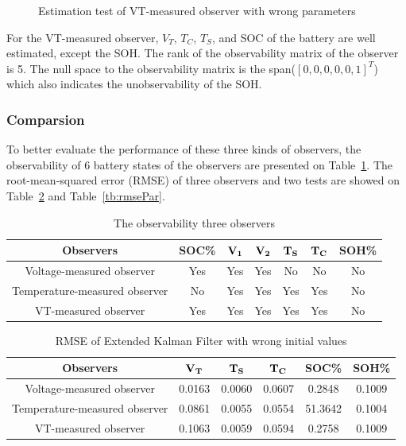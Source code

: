 \documentclass[12pt]{article}
\begin{document}
\begin{figure}[H]
\begin{subfigure}[t]{0.3\linewidth}
	\end{subfigure}	
	\caption{Estimation test of VT-measured observer with wrong parameters 
	}\label{fig:estVTpar}
\end{figure}
For the VT-measured observer, $V_T$, $T_C$, $T_S$, and SOC of the battery are well estimated, except the SOH. The rank of the observability matrix of the observer is 5. The null space to the observability matrix is the span($[0,0,0,0,0,1]^T$) which also indicates the unobservability of the SOH.
\subsubsection{Comparsion}
To better evaluate the performance of these three kinds of observers, the observability of 6 battery states of the observers are presented on Table~\ref{tb:ob?}. The root-mean-squared error (RMSE) of three observers and two tests are showed on Table~\ref{tb:rmseIni} and Table~\ref{tb:rmsePar}.
\begin{table}[H]
	\caption{The observability three observers}
	\vspace{-0.4cm}
	\label{tb:ob?}
	\centering
	\begin{tabular}{ccccccc}
		\hline
		\textbf{Observers}&\textbf{SOC\%}&$\bf{V_1}$&$\bf{V_2}$&$\bf{T_S}$&$\bf{T_C}$&\textbf{SOH\%}\\
		\hline
		Voltage-measured observer&Yes&Yes&Yes&No&No&No\\
		Temperature-measured observer&No&Yes&Yes&Yes&Yes&No\\
		VT-measured observer&Yes&Yes&Yes&Yes&Yes&No\\
		\hline
	\end{tabular}
\end{table}
\begin{table}[H]
	\caption{RMSE of Extended Kalman Filter with wrong initial values}
	\vspace{-0.4cm}
	\label{tb:rmseIni}
	\centering
	\begin{tabular}{cccccc}
		\hline
		\textbf{Observers}&$\bf{V_T}$&$\bf{T_S}$&$\bf{T_C}$&\textbf{SOC\%}&\textbf{SOH\%}\\
		\hline
		Voltage-measured observer&0.0163&0.0060&0.0607&0.2848&0.1009\\
		Temperature-measured observer&0.0861&0.0055&0.0554&51.3642&0.1004\\
		VT-measured observer&0.1063&0.0059&0.0594&0.2758&0.1009\\
		\hline
	\end{tabular}
\end{table}
\end{document}
